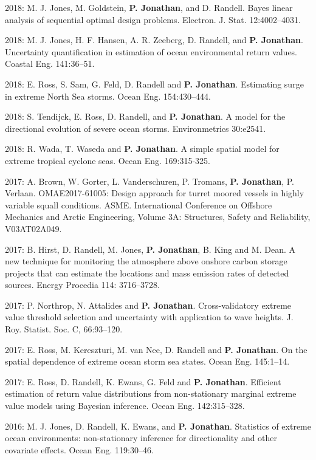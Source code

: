 \documentclass[11pt,a4paper]{moderncv}
\begin{document}
2018: M. J. Jones, M. Goldstein, \textbf{P. Jonathan}, and D. Randell. Bayes linear analysis of sequential optimal design problems. Electron. J. Stat. 12:4002--4031.

2018: M. J. Jones, H. F. Hansen, A. R. Zeeberg, D. Randell, and \textbf{P. Jonathan}. Uncertainty quantification in estimation of ocean environmental return values. Coastal Eng. 141:36--51.

2018: E. Ross, S. Sam, G. Feld, D. Randell and \textbf{P. Jonathan}. Estimating surge in extreme North Sea storms. Ocean Eng. 154:430--444.

2018: S. Tendijck, E. Ross, D. Randell, and \textbf{P. Jonathan}. A model for the directional evolution of severe ocean storms. Environmetrics 30:e2541.

2018: R. Wada, T. Waseda and \textbf{P. Jonathan}. A simple spatial model for extreme tropical cyclone seas.  Ocean Eng. 169:315-325.

2017: A. Brown, W. Gorter, L. Vanderschuren, P. Tromans, \textbf{P. Jonathan}, P. Verlaan. OMAE2017-61005: Design approach for turret moored vessels in highly variable squall conditions. ASME. International Conference on Offshore Mechanics and Arctic Engineering, Volume 3A: Structures, Safety and Reliability, V03AT02A049.

2017: B. Hirst, D. Randell, M. Jones, \textbf{P. Jonathan}, B. King and M. Dean. A new technique for monitoring the atmosphere above onshore carbon storage projects that can estimate the locations and mass emission rates of detected sources.  Energy Procedia 114: 3716--3728.

2017: P. Northrop, N. Attalides and \textbf{P. Jonathan}. Cross-validatory extreme value threshold selection and uncertainty with application to wave heights. J. Roy. Statist. Soc. C, 66:93--120.

2017: E. Ross, M. Kereszturi, M. van Nee, D. Randell and \textbf{P. Jonathan}. On the spatial dependence of extreme ocean storm sea states. Ocean Eng. 145:1--14.

2017: E. Ross, D. Randell, K. Ewans, G. Feld and \textbf{P. Jonathan}. Efficient estimation of return value distributions from non-stationary marginal extreme value models using Bayesian inference. Ocean Eng. 142:315--328.

2016: M. J. Jones, D. Randell, K. Ewans, and \textbf{P. Jonathan}. Statistics of extreme ocean environments: non-stationary inference for directionality and other covariate effects. Ocean Eng. 119:30--46.
\end{document}
